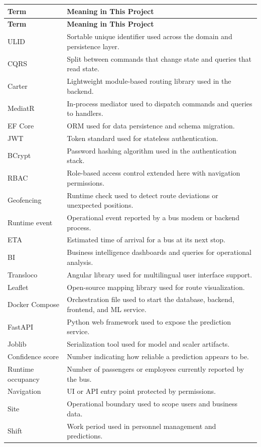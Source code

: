 \small
\begin{longtable}{p{3.2cm}p{10.3cm}}
\toprule
\textbf{Term} & \textbf{Meaning in This Project} \\
\midrule
\endfirsthead
\toprule
\textbf{Term} & \textbf{Meaning in This Project} \\
\midrule
\endhead
\bottomrule
\endlastfoot
ULID & Sortable unique identifier used across the domain and persistence layer. \\
CQRS & Split between commands that change state and queries that read state. \\
Carter & Lightweight module-based routing library used in the backend. \\
MediatR & In-process mediator used to dispatch commands and queries to handlers. \\
EF Core & ORM used for data persistence and schema migration. \\
JWT & Token standard used for stateless authentication. \\
BCrypt & Password hashing algorithm used in the authentication stack. \\
RBAC & Role-based access control extended here with navigation permissions. \\
Geofencing & Runtime check used to detect route deviations or unexpected positions. \\
Runtime event & Operational event reported by a bus modem or backend process. \\
ETA & Estimated time of arrival for a bus at its next stop. \\
BI & Business intelligence dashboards and queries for operational analysis. \\
Transloco & Angular library used for multilingual user interface support. \\
Leaflet & Open-source mapping library used for route visualization. \\
Docker Compose & Orchestration file used to start the database, backend, frontend, and ML service. \\
FastAPI & Python web framework used to expose the prediction service. \\
Joblib & Serialization tool used for model and scaler artifacts. \\
Confidence score & Number indicating how reliable a prediction appears to be. \\
Runtime occupancy & Number of passengers or employees currently reported by the bus. \\
Navigation & UI or API entry point protected by permissions. \\
Site & Operational boundary used to scope users and business data. \\
Shift & Work period used in personnel management and predictions. \\
\end{longtable}
\normalsize

